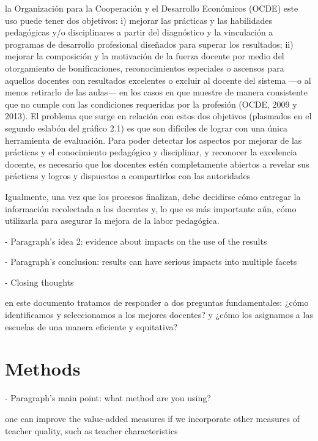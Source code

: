 la Organización para la Cooperación y el Desarrollo Económicos (OCDE) este uso puede tener dos objetivos: i) mejorar las prácticas y las habilidades pedagógicas y/o disciplinares a partir del diagnóstico y la vinculación a programas de desarrollo profesional diseñados para superar los resultados; ii) mejorar la composición y la motivación de la fuerza docente por medio del otorgamiento de bonificaciones, reconocimientos especiales o ascensos para aquellos docentes con resultados excelentes o excluir al docente del sistema —o al menos retirarlo de las aulas— en los casos en que muestre de manera consistente que no cumple con las condiciones requeridas por la profesión (OCDE, 2009 y 2013).
El problema que surge en relación con estos dos objetivos (plasmados en el segundo eslabón del gráfico 2.1) es que son difíciles de lograr con una única herramienta de evaluación.
Para poder detectar los aspectos por mejorar de las prácticas y el conocimiento pedagógico y disciplinar, y reconocer la excelencia docente, es necesario que los docentes estén completamente abiertos a revelar sus prácticas y logros y dispuestos a compartirlos con las autoridades \citep{Hincapie_et_al_2020}

Igualmente, una vez que los procesos finalizan, debe decidirse cómo entregar la información recolectada a los docentes y, lo que es más importante aún, cómo utilizarla para asegurar la mejora de la labor pedagógica. \citep{Hincapie_et_al_2020}



- Paragraph's idea 2: evidence about impacts on the use of the results


- Paragraph's conclusion: results can have serious impacts into multiple facets




- Closing thoughts

en este documento tratamos de responder a dos preguntas fundamentales: ¿cómo identificamos y seleccionamos a los mejores docentes? y ¿cómo los asignamos a las escuelas de una manera eficiente y equitativa? \citep{Bertoni_et_al_2020b}



\section{Methods}

- Paragraph's main point: what method are you using?

one can improve the value-added measures if we incorporate other measures of teacher quality, such as teacher characteristics \citep{Chetty_et_al_2014a}

